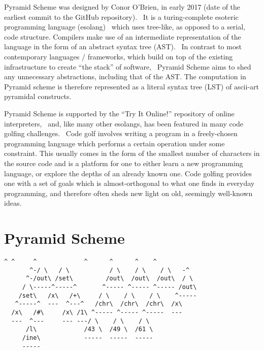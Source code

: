 \documentclass[aip,jcp,reprint,footinbib]{revtex4-1}
\let\tt\texttt
\newcommand{\ilpsll}[1]{\lstinline[language=psll,columns=flexible]{#1}}
\begin{document}
Pyramid Scheme was designed by Conor O'Brien, in early 2017 (date of the earliest commit to the GitHub repository).~\cite{pyra_git} It is a turing-complete esoteric programming language (esolang)~\cite{pyra_esolang,blen_git} which uses tree-like, as opposed to a serial, code structure. Compilers make use of an intermediate representation of the language in the form of an abstract syntax tree (AST).~\cite{cooper2011} In contrast to most contemporary languages / frameworks, which build on top of the existing infrastructure to create \enquote{the stack} of software,~\cite{cantrill2017,muratori2018} Pyramid Scheme aims to shed any unnecessary abstractions, including that of the AST. The computation in Pyramid scheme is therefore represented as a literal syntax tree (LST) of ascii-art pyramidal constructs.

Pyramid Scheme is supported by the \enquote{Try It Online!} repository of online interpreters,~\cite{tio} and, like many other esolangs, has been featured in many code golfing challenges.~\cite{golf_se} Code golf involves writing a program in a freely-chosen programming language which performs a certain operation under some constraint. This usually comes in the form of the smallest number of characters in the source code and is a platform for one to either learn a new programming language, or explore the depths of an already known one. Code golfing provides one with a set of goals which is almost-orthogonal to what one finds in everyday programming, and therefore often sheds new light on old, seemingly well-known ideas.

\section{Pyramid Scheme}\label{sec:pyramid_scheme}

\begin{lstlisting}[float,language=pyra,
    label=lst:pyra_simple, caption={
        A simple Pyramid Scheme program. It takes one input from \tt{stdin} -- \ilpsll{(set x (\# stdin))}, increments it by one -- \ilpsll{(set x (+ x 1))} and prints the result computation to the command line. \href{https://tio.run/\%23\%23dZDRCoMwDEXf@xWFPY4SRBnsX0JhuILC3IY6cF/fpUlbV91SzDEl9zbk@R4vQ381U9u5wXmvOSwd4XfYPaySfwMaiZJTxKqAEQUJHq8ZNUxuXiVyt4VGJXITwkpOI3G1AQtJk8xh4XzEv1NFpdLZPfhwFV6CthtxhwVVdD5EZ6qgwt9DBUeVXbk/kL7dQLwhuGGxfGjq0ADNmXGq4lr6uysa19cyVLr2vv4A}{Try it online!}
}]
        ^ ^     ^             ^      ^      ^    ^
       ^-/ \   / \           / \    / \    / \   -^
      ^-/out\ /set\         /out\  /out\  /out\  / \
     / \-----^-----^       ^----- ^----- ^----- /out\
    /set\   /x\   /+\     / \    / \    / \    ^-----
   ^-----^  ---  ^---^   /chr\  /chr\  /chr\  /x\
  /x\   /#\     /x\ /1\ ^----- ^----- ^-----  ---
  ---  ^---     --- ---/ \    / \    / \
      /l\             /43 \  /49 \  /61 \
     /ine\            -----  -----  -----
     -----
\end{lstlisting}
\end{document}
